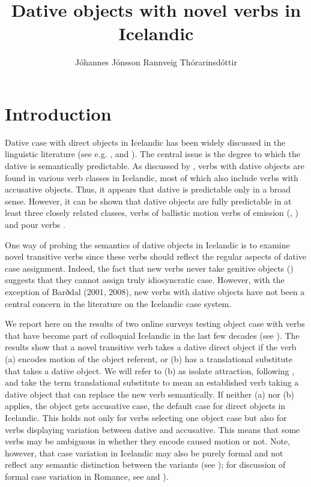 \documentclass[output=paper,modfonts,nonflat,colorlinks,citecolor=brown]{langsci/langscibook}
\author{Jóhannes Jónsson\affiliation{Unversity of Iceland}\lastand
Rannveig Thórarinsdóttir\affiliation{Unversity of Iceland}}
\title{Dative objects with novel verbs in Icelandic}
\begin{document}
\maketitle 
 

 

\section{Introduction} %

Dative case with direct objects in Icelandic has been widely discussed in the linguistic literature (see e.g. \citealt{YipEtAl1987,Barðdal2001,Barðdal2008,Svenonius2002,Maling2002}, and \citealt{Jónsson2013a}). The central issue is the degree to which the dative is semantically predictable. As discussed by \citet{Maling2002}, verbs with dative objects are found in various verb classes in Icelandic, most of which also include verbs with accusative objects. Thus, it appears that dative is predictable only in a broad sense. However, it can be shown that dative objects are fully predictable in at least three closely related classes, verbs of ballistic motion \citep{Svenonius2002} verbs of emission (\citealt{Maling2002}, \citealt{Jónsson2013a}) and pour verbs \citep{Jónsson2013a}.

One way of probing the semantics of dative objects in Icelandic is to examine novel transitive verbs since these verbs should reflect the regular aspects of dative case assignment. Indeed, the fact that new verbs never take genitive objects (\citealt{JónssonEythórsson2011}) suggests that they cannot assign truly idiosyncratic case. However, with the exception of Barðdal (2001, 2008), new verbs with dative objects have not been a central concern in the literature on the Icelandic case system. 

We report here on the results of two online surveys testing object case with verbs that have become part of colloquial Icelandic in the last few decades (see \citealt{Thórarinsdóttir2015}). The results show that a novel transitive verb takes a dative direct object if the verb (a) encodes motion of the object referent, or (b) has a translational substitute that takes a dative object. We will refer to (b) as isolate attraction, following \citet{Barðdal2001}, and take the term translational substitute to mean an established verb taking a dative object that can replace the new verb semantically. If neither (a) nor (b) applies, the object gets accusative case, the default case for direct objects in Icelandic. This holds not only for verbs selecting one object case but also for verbs displaying variation between dative and accusative. This means that some verbs may be ambiguous in whether they encode caused motion or not. Note, however, that case variation in Icelandic may also be purely formal and not reflect any semantic distinction between the variants (see \citealt{Jónsson2013b}); for discussion of formal case variation in Romance, see  and ).
\end{document}
